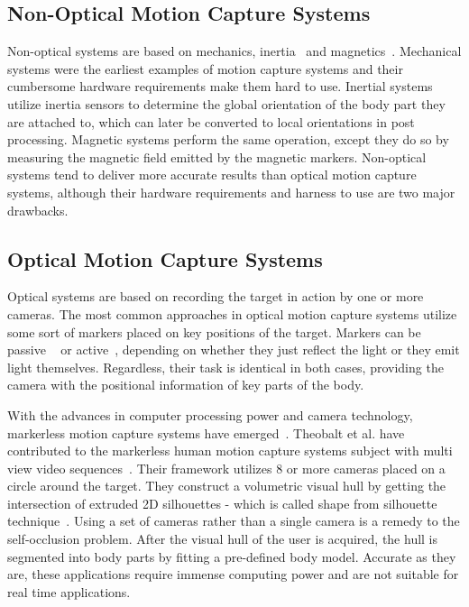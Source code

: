 \subsection{Non-Optical Motion Capture Systems}
 
Non-optical systems are based on mechanics, inertia~\cite{Miller2004} and magnetics~\cite{Yabukami2000}. Mechanical systems were the earliest examples of motion capture systems and their cumbersome hardware requirements make them hard to use. Inertial systems utilize inertia sensors to determine the global orientation of the body part they are attached to, which can later be converted to local orientations in post processing. Magnetic systems perform the same operation, except they do so by measuring the magnetic field emitted by the magnetic markers. Non-optical systems tend to deliver more accurate results than optical motion capture systems, although their hardware requirements and harness to use are two major drawbacks. 
 
\subsection{Optical Motion Capture Systems}

Optical systems are based on recording the target in action by one or more cameras. The most common approaches in optical motion capture systems utilize some sort of markers placed on key positions of the target. Markers can be passive ~\cite{Sementille2004} or active~\cite{Maletsky2007}, depending on whether they just reflect the light or they emit light themselves. Regardless, their task is identical in both cases, providing the camera with the positional information of key parts of the body. 
 
With the advances in computer processing power and camera technology, markerless motion capture systems have emerged~\cite{Cheung2003}. Theobalt et al. have contributed to the markerless human motion capture systems subject with multi view video sequences~\cite{Aguiar2007,Gall2009,Liu2011}. Their framework utilizes 8 or more cameras placed on a circle around the target. They construct a volumetric visual hull by getting the intersection of extruded 2D silhouettes - which is called shape from silhouette technique~\cite{Cheung2000,Cheung2005}. Using a set of cameras rather than a single camera is a remedy to the self-occlusion problem. After the visual hull of the user is acquired, the hull is segmented into body parts by fitting a pre-defined body model. Accurate as they are, these
applications require immense computing power and are not suitable for real time applications. 
 
